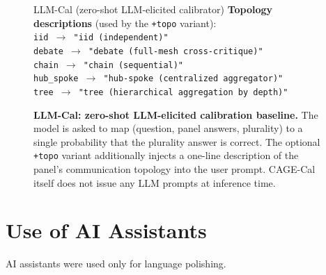 \begin{figure}[t]
\begin{promptbox2}{LLM-Cal (zero-shot LLM-elicited calibrator)}
\textbf{Topology descriptions} (used by the \texttt{+topo} variant):\\[2pt]
\texttt{iid \(\rightarrow\) "iid (independent)"\\
debate \(\rightarrow\) "debate (full-mesh cross-critique)"\\
chain \(\rightarrow\) "chain (sequential)"\\
hub\_spoke \(\rightarrow\) "hub-spoke (centralized aggregator)"\\
tree \(\rightarrow\) "tree (hierarchical aggregation by depth)"}
\end{promptbox2}

\caption{\textbf{LLM-Cal: zero-shot LLM-elicited calibration baseline.}
The model is asked to map (question, panel answers, plurality) to a
single probability that the plurality answer is correct. The
optional \texttt{+topo} variant additionally injects a one-line
description of the panel's communication topology into the user
prompt. CAGE-Cal itself does not issue any LLM prompts at inference
time.}
\label{fig:appendix:llmcal-prompt}
\end{figure}

\section{Use of AI Assistants}
AI assistants were used only for language polishing.